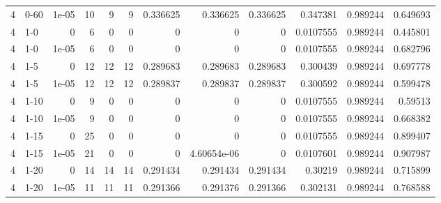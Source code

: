 \begin{tabular}{rlrrrrrrrrrr}
     4 & 0-60   &      1e-05 &          10 &                 9 &                 9 &     0.336625    &     0.336625    &      0.336625    &        0.347381  &               0.989244 &           0.649693 \\
     4 & 1-0    &      0     &           6 &                 0 &                 0 &     0           &     0           &      0           &        0.0107555 &               0.989244 &           0.445801 \\
     4 & 1-0    &      1e-05 &           6 &                 0 &                 0 &     0           &     0           &      0           &        0.0107555 &               0.989244 &           0.682796 \\
     4 & 1-5    &      0     &          12 &                12 &                12 &     0.289683    &     0.289683    &      0.289683    &        0.300439  &               0.989244 &           0.697778 \\
     4 & 1-5    &      1e-05 &          12 &                12 &                12 &     0.289837    &     0.289837    &      0.289837    &        0.300592  &               0.989244 &           0.599478 \\
     4 & 1-10   &      0     &           9 &                 0 &                 0 &     0           &     0           &      0           &        0.0107555 &               0.989244 &           0.59513  \\
     4 & 1-10   &      1e-05 &           9 &                 0 &                 0 &     0           &     0           &      0           &        0.0107555 &               0.989244 &           0.668382 \\
     4 & 1-15   &      0     &          25 &                 0 &                 0 &     0           &     0           &      0           &        0.0107555 &               0.989244 &           0.899407 \\
     4 & 1-15   &      1e-05 &          21 &                 0 &                 0 &     0           &     4.60654e-06 &      0           &        0.0107601 &               0.989244 &           0.907987 \\
     4 & 1-20   &      0     &          14 &                14 &                14 &     0.291434    &     0.291434    &      0.291434    &        0.30219   &               0.989244 &           0.715899 \\
     4 & 1-20   &      1e-05 &          11 &                11 &                11 &     0.291366    &     0.291376    &      0.291366    &        0.302131  &               0.989244 &           0.768588 \\

\end{tabular}
